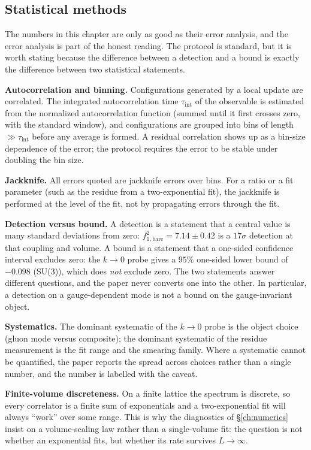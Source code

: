 \figdiag

\subsection{Statistical methods}

The numbers in this chapter are only as good as their error analysis, and the error analysis is
part of the honest reading. The protocol is standard, but it is worth stating because the
difference between a detection and a bound is exactly the difference between two statistical
statements.

\textbf{Autocorrelation and binning.} Configurations generated by a local update are correlated.
The integrated autocorrelation time $\tau_{\mathrm{int}}$ of the observable is estimated from the
normalized autocorrelation function (summed until it first crosses zero, with the standard
window), and configurations are grouped into bins of length $\gg\tau_{\mathrm{int}}$ before any
average is formed. A residual correlation shows up as a bin-size dependence of the error; the
protocol requires the error to be stable under doubling the bin size.

\textbf{Jackknife.} All errors quoted are jackknife errors over bins. For a ratio or a fit
parameter (such as the residue from a two-exponential fit), the jackknife is performed at the
level of the fit, not by propagating errors through the fit.

\textbf{Detection versus bound.} A detection is a statement that a central value is many
standard deviations from zero: $f_{1,\mathrm{bare}}^2=7.14\pm0.42$ is a $17\sigma$ detection at
that coupling and volume. A bound is a statement that a one-sided confidence interval excludes
zero: the $k\to0$ probe gives a $95\%$ one-sided lower bound of $-0.098$ (SU(3)), which does
\emph{not} exclude zero. The two statements answer different questions, and the paper never
converts one into the other. In particular, a detection on a gauge-dependent mode is not a bound
on the gauge-invariant object.

\textbf{Systematics.} The dominant systematic of the $k\to0$ probe is the object choice (gluon
mode versus composite); the dominant systematic of the residue measurement is the fit range and
the smearing family. Where a systematic cannot be quantified, the paper reports the spread across
choices rather than a single number, and the number is labelled \LE{} with the caveat.

\textbf{Finite-volume discreteness.} On a finite lattice the spectrum is discrete, so every
correlator is a finite sum of exponentials and a two-exponential fit will always ``work'' over
some range. This is why the diagnostics of \S\ref{ch:numerics} insist on a volume-scaling law
rather than a single-volume fit: the question is not whether an exponential fits, but whether its
rate survives $L\to\infty$.

